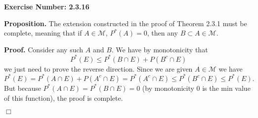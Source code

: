 \documentclass{article}
\begin{document}
\noindent \textbf{Exercise Number: 2.3.16}  %

\medskip 

\noindent \textbf{Proposition.} The extension constructed in the proof of Theorem 2.3.1 must be complete, meaning that if $A \in \mathcal{M}$, $P^*(A) = 0$, then any $B \subset A \in \mathcal{M}$. 

\bigskip

\noindent \textbf{Proof.} Consider any such $A$ and $B$. We have by monotonicity that \[P^*(E) \leq P^*(B \cap E) + P(B^c \cap E)\] we just need to prove the reverse direction. Since we are given $A \in \mathcal{M}$ we have \[P^*(E) = P^*(A \cap E) + P(A^c \cap E) = P^*(A^c \cap E) \leq P^*(B^c \cap E) \leq P^*(E). \] But because $P^*(A \cap E) = P^*(B \cap E) = 0$ (by monotonicity 0 is the min value of this function), the proof is complete. 

\hfill $\Box$
\end{document}
